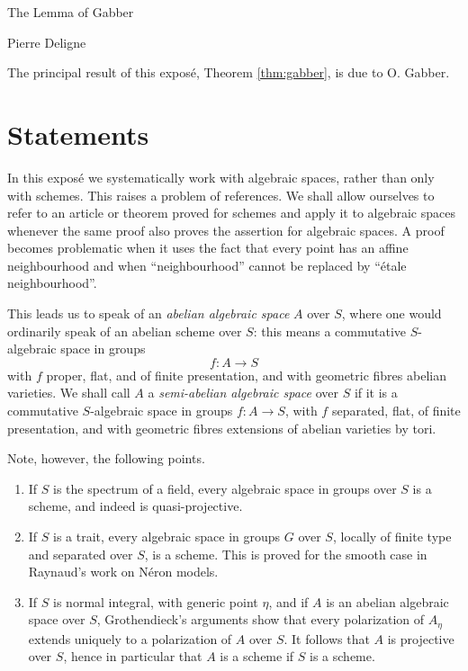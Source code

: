 

\begin{center}
  {\Large The Lemma of Gabber}\par\vspace{0.5em}
  {Pierre Deligne}\par
\end{center}

The principal result of this exposé, Theorem \ref{thm:gabber}, is due to O. Gabber.

\section{Statements}

In this exposé we systematically work with algebraic spaces, rather than only with schemes. This raises a problem of references. We shall allow ourselves to refer to an article or theorem proved for schemes and apply it to algebraic spaces whenever the same proof also proves the assertion for algebraic spaces. A proof becomes problematic when it uses the fact that every point has an affine neighbourhood and when ``neighbourhood'' cannot be replaced by ``étale neighbourhood''.

This leads us to speak of an \emph{abelian algebraic space} $A$ over $S$, where one would ordinarily speak of an abelian scheme over $S$: this means a commutative $S$-algebraic space in groups
\[
  f:A\longrightarrow S
\]
with $f$ proper, flat, and of finite presentation, and with geometric fibres abelian varieties. We shall call $A$ a \emph{semi-abelian algebraic space} over $S$ if it is a commutative $S$-algebraic space in groups $f:A\to S$, with $f$ separated, flat, of finite presentation, and with geometric fibres extensions of abelian varieties by tori.

Note, however, the following points.
\begin{enumerate}[label=(\alph*)]
\item If $S$ is the spectrum of a field, every algebraic space in groups over $S$ is a scheme, and indeed is quasi-projective.
\item If $S$ is a trait, every algebraic space in groups $G$ over $S$, locally of finite type and separated over $S$, is a scheme. This is proved for the smooth case in Raynaud's work on Néron models.
\item If $S$ is normal integral, with generic point $\eta$, and if $A$ is an abelian algebraic space over $S$, Grothendieck's arguments show that every polarization of $A_\eta$ extends uniquely to a polarization of $A$ over $S$. It follows that $A$ is projective over $S$, hence in particular that $A$ is a scheme if $S$ is a scheme.
\end{enumerate}

